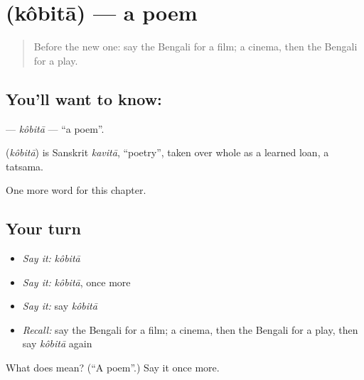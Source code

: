\section[\texorpdfstring{\bn{কবিতা} (kôbitā)}{কবিতা (kôbitā)}]{ (kôbitā) — a poem}

\label{lesson:BN-C225-kobita}



\begin{quote}
Before the new one: say the Bengali for a film; a cinema, then the Bengali for a play.
\end{quote}

\subsection*{You'll want to know: }
\textbf{} — \emph{kôbitā} — \textquotedblleft{}a poem\textquotedblright{}.

\begin{cousinweb}
\textbf{} (\emph{kôbitā}) is Sanskrit \emph{kavitā}, \textquotedblleft{}poetry\textquotedblright{}, taken over whole as a learned loan, a tatsama.
\end{cousinweb}

\begin{grammarlens}[title={What you've built}]
One more word for this chapter.
\end{grammarlens}

\subsection*{Your turn}
\begin{itemize}
\raggedright
  \item \emph{Say it:} \emph{kôbitā}
  \item \emph{Say it:} \emph{kôbitā}, once more
  \item \emph{Say it:} say \emph{kôbitā}
  \item \emph{Recall:} say the Bengali for a film; a cinema, then the Bengali for a play, then say \emph{kôbitā} again
\end{itemize}

\begin{tcolorbox}[breakable,colback=teal!4,colframe=teal!35!black,title={Before you move on}]
What does  mean? (\textquotedblleft{}A poem\textquotedblright{}.) Say it once more.
\end{tcolorbox}
